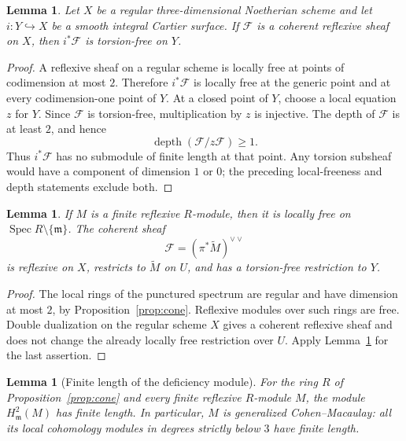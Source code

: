 \documentclass[11pt,reqno]{amsart}
\numberwithin{equation}{section}
\newtheorem{lemma}[theorem]{Lemma}
\theoremstyle{definition}
\theoremstyle{remark}
\newcommand{\FF}{\mathcal F}
\newcommand{\mm}{\mathfrak m}
\newcommand{\Spec}{\operatorname{Spec}}
\newcommand{\depth}{\operatorname{depth}}
\begin{document}
\begin{lemma}\label{lem:restriction}
Let $X$ be a regular three-dimensional Noetherian scheme and let
$i:Y\hookrightarrow X$ be a smooth integral Cartier surface. If
$\FF$ is a coherent reflexive sheaf on $X$, then $i^*\FF$ is
torsion-free on $Y$.
\end{lemma}

\begin{proof}
A reflexive sheaf on a regular scheme is locally free at points of
codimension at most $2$. Therefore $i^*\FF$ is locally free at the
generic point and at every codimension-one point of $Y$.
At a closed point of $Y$, choose a local equation $z$ for $Y$.
Since $\FF$ is torsion-free, multiplication by $z$ is injective.
The depth of $\FF$ is at least $2$, and hence
\[
 \depth(\FF/z\FF)\geq1.
\]
Thus $i^*\FF$ has no submodule of finite length at that point.
Any torsion subsheaf would have a component of dimension $1$ or $0$;
the preceding local-freeness and depth statements exclude both.
\end{proof}

\begin{lemma}\label{lem:extension}
If $M$ is a finite reflexive $R$-module, then it is locally free on
$\Spec R\setminus\{\mm\}$. The coherent sheaf
\begin{equation}\label{eq:extension}
 \FF=(\pi^*\widetilde M)^{\vee\vee}
\end{equation}
is reflexive on $X$, restricts to $\widetilde M$ on $U$, and has a
torsion-free restriction to $Y$.
\end{lemma}

\begin{proof}
The local rings of the punctured spectrum are regular and have
dimension at most $2$, by Proposition~\ref{prop:cone}. Reflexive
modules over such rings are free. Double dualization on the regular
scheme $X$ gives a coherent reflexive sheaf and does not change the
already locally free restriction over $U$. Apply
Lemma~\ref{lem:restriction} for the last assertion.
\end{proof}

\begin{lemma}[Finite length of the deficiency module]\label{lem:finite-deficiency}
For the ring $R$ of Proposition~\ref{prop:cone} and every finite
reflexive $R$-module $M$, the module $H^2_\mm(M)$ has finite length.
In particular, $M$ is generalized Cohen--Macaulay: all its local
cohomology modules in degrees strictly below $3$ have finite length.
\end{lemma}
\end{document}

